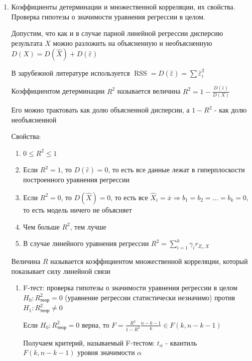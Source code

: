 \begin{enumerate}
    \item Коэффициенты детерминации и множественной корреляции, их свойства. Проверка гипотезы о значимости уравнения регрессии в целом.

    Допустим, что как и в случае парной линейной регрессии дисперсию результата $X$ можно разложить на объясненную и необъясненную $D(X) = D(\hat X) + D(\hat \varepsilon)$

    \Nota В зарубежной литературе используется $\operatorname{RSS} = D(\hat \varepsilon) = \sum \hat \varepsilon_i^2$

    \Def Коэффициентом детерминации $R^2$ называется величина $R^2 = 1 - \frac{D(\hat \varepsilon)}{D(X)}$

    Его можно трактовать как долю объясненной дисперсии, а $1 - R^2$ - как долю необъясненной

    Свойства:

    \begin{enumerate}
        \item $0 \leq R^2 \leq 1$
        \item Если $R^2 = 1$, то $D(\hat \varepsilon) = 0$, то есть все данные лежат в гиперплоскости построенного уравнения регрессии
        \item Если $R^2 = 0$, то $D(\hat X) = 0$, то есть все $\hat X_i = \overline{x} \Longrightarrow b_1 = b_2 = \dots = b_k = 0$, то есть модель ничего не объясняет
        \item Чем больше $R^2$, тем лучше
        \item В случае линейного уравнения регрессии $R^2 = \sum_{i = 1}^k \gamma_i r_{Z_i, X}$
    \end{enumerate}

    \Def Величина $R$ называется коэффициентом множественной корреляции, который показывает силу линейной связи

    \begin{enumerate}[label*=\asbuk*) ]
        \item F-тест: проверка гипотезы о значимости уравнения регрессии в целом 
        $H_0 : R^2_\text{теор} = 0 $ (уравнение регрессии статистически незначимо) против $H_1 : R^2_\text{теор} \neq 0$

        \begin{MyTheorem}
            \Ths Если $H_0 : R^2_\text{теор} = 0$ верна, то $F = \frac{R^2}{1 - R^2} \frac{n - k - 1}{k} \in F(k, n - k - 1)$
        \end{MyTheorem}

        Получаем критерий, называемый F-тестом: $t_\alpha$ - квантиль $F(k, n - k - 1)$ уровня значимости $\alpha$


\end{enumerate}
\end{enumerate}
